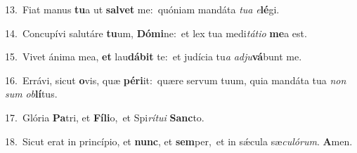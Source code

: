 {\numbfont\textcolor{\numbcolor}{13.}}~Fiat manus \textbf{tu}\-a ut \textbf{sal}\-\textbf{vet} me:~\star quóniam mandáta \textit{tu}\-\textit{a} \textit{e}\-\textbf{lé}gi.\par
{\numbfont\textcolor{\numbcolor}{14.}}~Concupívi salutáre \textbf{tu}\-um, \textbf{Dó}\-\textbf{mi}ne:~\star et lex tua medi\-\textit{tá}\-\textit{ti}\textit{o} \textbf{me}\-a est.\par
{\numbfont\textcolor{\numbcolor}{15.}}~Vivet ánima mea, \textbf{et} lau\-\textbf{dá}\-\textbf{bit} te:~\star et judícia tu\textit{a} \textit{ad}\-\textit{ju}\textbf{vá}bunt me.\par
{\numbfont\textcolor{\numbcolor}{16.}}~Errávi, sicut \textbf{o}\-vis, quæ \textbf{pér}\-\textbf{i}it:~\star quære servum tuum, quia mandáta tua \textit{non} \textit{sum} \textit{ob}\-\textbf{lí}tus.\par
{\numbfont\textcolor{\numbcolor}{17.}}~Glória \textbf{Pa}\-tri, et \textbf{Fí}\-\textbf{li}o,~\star et Spi\-\textit{rí}\-\textit{tu}\textit{i} \textbf{Sanc}\-to.\par
{\numbfont\textcolor{\numbcolor}{18.}}~Sicut erat in princípio, et \textbf{nunc}\-, et \textbf{sem}\-per,~\star et in sǽcula sæ\-\textit{cu}\-\textit{ló}\textit{rum}. \textbf{A}\-men.\par
